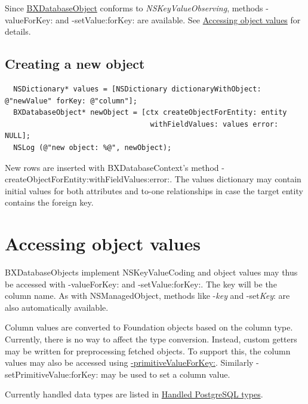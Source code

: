 Since \hyperlink{interface_b_x_database_object}{B\+X\+Database\+Object} conforms to {\itshape N\+S\+Key\+Value\+Observing}, methods -\/value\+For\+Key\+: and -\/set\+Value\+:for\+Key\+: are available. See \hyperlink{accessing_values}{Accessing object values} for details.\hypertarget{getting_started_creating_objects}{}\subsection{Creating a new object}\label{getting_started_creating_objects}
 
  \begin{lstlisting}
  NSDictionary* values = [NSDictionary dictionaryWithObject: @"newValue" forKey: @"column"];
  BXDatabaseObject* newObject = [ctx createObjectForEntity: entity 
                                  withFieldValues: values error: NULL];
  NSLog (@"new object: %@", newObject);
  \end{lstlisting}
   

New rows are inserted with B\+X\+Database\+Context's method -\/create\+Object\+For\+Entity\+:with\+Field\+Values\+:error\+:. The values dictionary may contain initial values for both attributes and to-\/one relationships in case the target entity contains the foreign key. \hypertarget{accessing_values}{}\section{Accessing object values}\label{accessing_values}
B\+X\+Database\+Objects implement N\+S\+Key\+Value\+Coding and object values may thus be accessed with -\/value\+For\+Key\+: and -\/set\+Value\+:for\+Key\+:. The key will be the column name. As with N\+S\+Managed\+Object, methods like -\/{\itshape key} and -\/set{\itshape Key}\+: are also automatically available.

Column values are converted to Foundation objects based on the column type. Currently, there is no way to affect the type conversion. Instead, custom getters may be written for preprocessing fetched objects. To support this, the column values may also be accessed using \hyperlink{interface_b_x_database_object_a0576661b8930420dce5248584dfc1add}{-\/primitive\+Value\+For\+Key\+:}. Similarly -\/set\+Primitive\+Value\+:for\+Key\+: may be used to set a column value.

Currently handled data types are listed in \hyperlink{database_types}{Handled Postgre\+S\+Q\+L types}.

